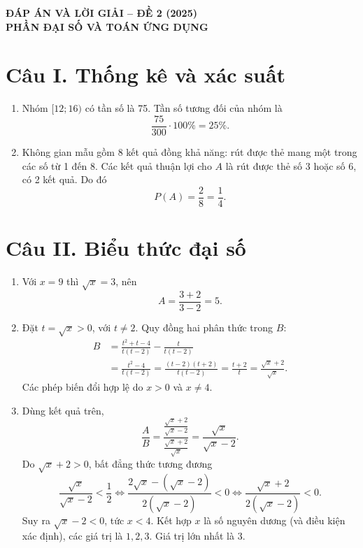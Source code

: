 \documentclass[12pt,a4paper]{article}
\begin{document}
\begin{center}
{\Large\bfseries ĐÁP ÁN VÀ LỜI GIẢI -- ĐỀ 2 (2025)}\\[2pt]
{\large\bfseries PHẦN ĐẠI SỐ VÀ TOÁN ỨNG DỤNG}
\end{center}

\section*{Câu I. Thống kê và xác suất}
\begin{enumerate}
\item Nhóm $[12;16)$ có tần số là 75. Tần số tương đối của nhóm là
\[
\frac{75}{300}\cdot100\%=25\%.
\]
\item Không gian mẫu gồm 8 kết quả đồng khả năng: rút được thẻ mang một trong các số từ 1 đến 8. Các kết quả thuận lợi cho $A$ là rút được thẻ số 3 hoặc số 6, có 2 kết quả. Do đó
\[
P(A)=\frac{2}{8}=\frac14.
\]
\end{enumerate}

\section*{Câu II. Biểu thức đại số}
\begin{enumerate}
\item Với $x=9$ thì $\sqrt{x}=3$, nên
\[
A=\frac{3+2}{3-2}=5.
\]
\item Đặt $t=\sqrt{x}>0$, với $t\ne2$. Quy đồng hai phân thức trong $B$:
\begin{align*}
B&=\frac{t^2+t-4}{t(t-2)}-\frac{t}{t(t-2)}\\
&=\frac{t^2-4}{t(t-2)}
=\frac{(t-2)(t+2)}{t(t-2)}
=\frac{t+2}{t}
=\frac{\sqrt{x}+2}{\sqrt{x}}.
\end{align*}
Các phép biến đổi hợp lệ do $x>0$ và $x\ne4$.
\item Dùng kết quả trên,
\[
\frac AB=\frac{\frac{\sqrt{x}+2}{\sqrt{x}-2}}{\frac{\sqrt{x}+2}{\sqrt{x}}}=\frac{\sqrt{x}}{\sqrt{x}-2}.
\]
Do $\sqrt{x}+2>0$, bất đẳng thức tương đương
\[
\frac{\sqrt{x}}{\sqrt{x}-2}<\frac12
\iff \frac{2\sqrt{x}-(\sqrt{x}-2)}{2(\sqrt{x}-2)}<0
\iff \frac{\sqrt{x}+2}{2(\sqrt{x}-2)}<0.
\]
Suy ra $\sqrt{x}-2<0$, tức $x<4$. Kết hợp $x$ là số nguyên dương (và điều kiện xác định), các giá trị là $1,2,3$. Giá trị lớn nhất là $\boxed{3}$.
\end{enumerate}
\end{document}
